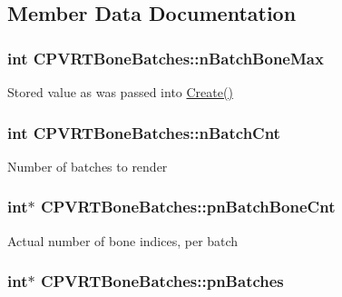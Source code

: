 \subsection{Member Data Documentation}
\hypertarget{class_c_p_v_r_t_bone_batches_af9b116c78dee953c533d4476418ad621}{
\subsubsection[{n\+Batch\+Bone\+Max}]{\setlength{\rightskip}{0pt plus 5cm}int C\+P\+V\+R\+T\+Bone\+Batches\+::n\+Batch\+Bone\+Max}}\label{class_c_p_v_r_t_bone_batches_af9b116c78dee953c533d4476418ad621}
Stored value as was passed into \hyperlink{class_c_p_v_r_t_bone_batches_a2a0037ba145fbb78e013867effaa1764}{Create()} \hypertarget{class_c_p_v_r_t_bone_batches_aa153761d4db66658f734a3d3ca649b05}{
\subsubsection[{n\+Batch\+Cnt}]{\setlength{\rightskip}{0pt plus 5cm}int C\+P\+V\+R\+T\+Bone\+Batches\+::n\+Batch\+Cnt}}\label{class_c_p_v_r_t_bone_batches_aa153761d4db66658f734a3d3ca649b05}
Number of batches to render \hypertarget{class_c_p_v_r_t_bone_batches_ae48f5f82f69a2bf19134aafdbb7b82f6}{
\subsubsection[{pn\+Batch\+Bone\+Cnt}]{\setlength{\rightskip}{0pt plus 5cm}int$\ast$ C\+P\+V\+R\+T\+Bone\+Batches\+::pn\+Batch\+Bone\+Cnt}}\label{class_c_p_v_r_t_bone_batches_ae48f5f82f69a2bf19134aafdbb7b82f6}
Actual number of bone indices, per batch \hypertarget{class_c_p_v_r_t_bone_batches_ad28f537c414b9f867ff7e97a2518ba2b}{
\subsubsection[{pn\+Batches}]{\setlength{\rightskip}{0pt plus 5cm}int$\ast$ C\+P\+V\+R\+T\+Bone\+Batches\+::pn\+Batches}}\label{class_c_p_v_r_t_bone_batches_ad28f537c414b9f867ff7e97a2518ba2b}
